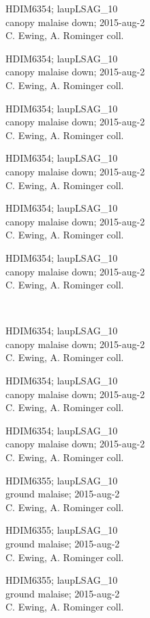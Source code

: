 \documentclass[2pt]{extarticle}
\begin{document}
\noindent
\parbox{0.16\textwidth}{\tiny \raggedright \rule[-0.3\baselineskip]{0pt}{10pt}HDIM6354; laupLSAG\_10\\ canopy malaise down; 2015-aug-2\\ C. Ewing, A. Rominger coll.}
\parbox{0.16\textwidth}{\tiny \raggedright \rule[-0.3\baselineskip]{0pt}{10pt}HDIM6354; laupLSAG\_10\\ canopy malaise down; 2015-aug-2\\ C. Ewing, A. Rominger coll.}
\parbox{0.16\textwidth}{\tiny \raggedright \rule[-0.3\baselineskip]{0pt}{10pt}HDIM6354; laupLSAG\_10\\ canopy malaise down; 2015-aug-2\\ C. Ewing, A. Rominger coll.}
\parbox{0.16\textwidth}{\tiny \raggedright \rule[-0.3\baselineskip]{0pt}{10pt}HDIM6354; laupLSAG\_10\\ canopy malaise down; 2015-aug-2\\ C. Ewing, A. Rominger coll.}
\parbox{0.16\textwidth}{\tiny \raggedright \rule[-0.3\baselineskip]{0pt}{10pt}HDIM6354; laupLSAG\_10\\ canopy malaise down; 2015-aug-2\\ C. Ewing, A. Rominger coll.}
\parbox{0.16\textwidth}{\tiny \raggedright \rule[-0.3\baselineskip]{0pt}{10pt}HDIM6354; laupLSAG\_10\\ canopy malaise down; 2015-aug-2\\ C. Ewing, A. Rominger coll.} \\ 
\vspace{0.001in} 

\noindent
\parbox{0.16\textwidth}{\tiny \raggedright \rule[-0.3\baselineskip]{0pt}{10pt}HDIM6354; laupLSAG\_10\\ canopy malaise down; 2015-aug-2\\ C. Ewing, A. Rominger coll.}
\parbox{0.16\textwidth}{\tiny \raggedright \rule[-0.3\baselineskip]{0pt}{10pt}HDIM6354; laupLSAG\_10\\ canopy malaise down; 2015-aug-2\\ C. Ewing, A. Rominger coll.}
\parbox{0.16\textwidth}{\tiny \raggedright \rule[-0.3\baselineskip]{0pt}{10pt}HDIM6354; laupLSAG\_10\\ canopy malaise down; 2015-aug-2\\ C. Ewing, A. Rominger coll.}
\parbox{0.16\textwidth}{\tiny \raggedright \rule[-0.3\baselineskip]{0pt}{10pt}HDIM6355; laupLSAG\_10\\ ground malaise; 2015-aug-2\\ C. Ewing, A. Rominger coll.}
\parbox{0.16\textwidth}{\tiny \raggedright \rule[-0.3\baselineskip]{0pt}{10pt}HDIM6355; laupLSAG\_10\\ ground malaise; 2015-aug-2\\ C. Ewing, A. Rominger coll.}
\parbox{0.16\textwidth}{\tiny \raggedright \rule[-0.3\baselineskip]{0pt}{10pt}HDIM6355; laupLSAG\_10\\ ground malaise; 2015-aug-2\\ C. Ewing, A. Rominger coll.} \\ 
\vspace{0.001in} 
\end{document}
